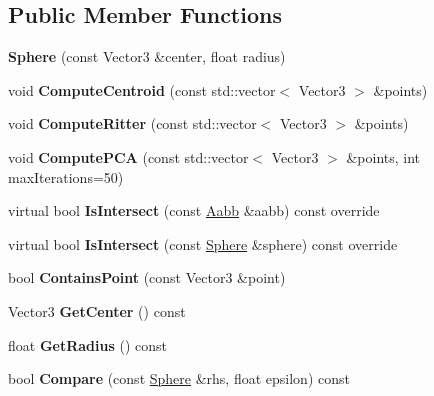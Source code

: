 \subsection*{Public Member Functions}
\begin{DoxyCompactItemize}
\item 
\mbox{\label{classSphere_aca7691f5e4744113f60a5e1ba643c207}} 
{\bfseries Sphere} (const Vector3 \&center, float radius)
\item 
\mbox{\label{classSphere_a2c39cbaee2f92e62c09f2d4efed61d4b}} 
void {\bfseries Compute\+Centroid} (const std\+::vector$<$ Vector3 $>$ \&points)
\item 
\mbox{\label{classSphere_a059e05ff35c11f73e5cef4ce44940c8c}} 
void {\bfseries Compute\+Ritter} (const std\+::vector$<$ Vector3 $>$ \&points)
\item 
\mbox{\label{classSphere_add8256dbb8bad21d6495d2547c7cb8b9}} 
void {\bfseries Compute\+P\+CA} (const std\+::vector$<$ Vector3 $>$ \&points, int max\+Iterations=50)
\item 
\mbox{\label{classSphere_aea1571e835842f502a64e4ddb30847e4}} 
virtual bool {\bfseries Is\+Intersect} (const \hyperlink{classAabb}{Aabb} \&aabb) const override
\item 
\mbox{\label{classSphere_aa97baa4e07d8b042f99150df0757d623}} 
virtual bool {\bfseries Is\+Intersect} (const \hyperlink{classSphere}{Sphere} \&sphere) const override
\item 
\mbox{\label{classSphere_afb32becb53288c8be90572047e996042}} 
bool {\bfseries Contains\+Point} (const Vector3 \&point)
\item 
\mbox{\label{classSphere_ab0d5d17030115760a276545a1362ce93}} 
Vector3 {\bfseries Get\+Center} () const
\item 
\mbox{\label{classSphere_a1be9f865028172ade600ed25ca0aee4f}} 
float {\bfseries Get\+Radius} () const
\item 
\mbox{\label{classSphere_adf99590b58fce09c26fa79041efa0b65}} 
bool {\bfseries Compare} (const \hyperlink{classSphere}{Sphere} \&rhs, float epsilon) const
\end{DoxyCompactItemize}
